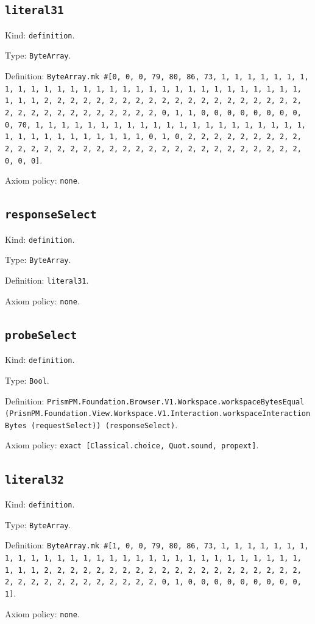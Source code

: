 \documentclass[11pt]{article}
\begin{document}
\subsection*{\texttt{literal31}}
\noindent Kind: \texttt{definition}.\par
\noindent Type: \texttt{ByteArray}.\par
\noindent Definition: \texttt{ByteArray.mk \#[0, 0, 0, 79, 80, 86, 73, 1, 1, 1, 1, 1, 1, 1, 1, 1, 1, 1, 1, 1, 1, 1, 1, 1, 1, 1, 1, 1, 1, 1, 1, 1, 1, 1, 1, 1, 1, 1, 1, 1, 2, 2, 2, 2, 2, 2, 2, 2, 2, 2, 2, 2, 2, 2, 2, 2, 2, 2, 2, 2, 2, 2, 2, 2, 2, 2, 2, 2, 2, 2, 2, 2, 0, 1, 1, 0, 0, 0, 0, 0, 0, 0, 0, 0, 70, 1, 1, 1, 1, 1, 1, 1, 1, 1, 1, 1, 1, 1, 1, 1, 1, 1, 1, 1, 1, 1, 1, 1, 1, 1, 1, 1, 1, 1, 1, 1, 1, 0, 1, 0, 2, 2, 2, 2, 2, 2, 2, 2, 2, 2, 2, 2, 2, 2, 2, 2, 2, 2, 2, 2, 2, 2, 2, 2, 2, 2, 2, 2, 2, 2, 2, 2, 0, 0, 0]}.\par
\noindent Axiom policy: \texttt{none}.\par
\subsection*{\texttt{responseSelect}}
\noindent Kind: \texttt{definition}.\par
\noindent Type: \texttt{ByteArray}.\par
\noindent Definition: \texttt{literal31}.\par
\noindent Axiom policy: \texttt{none}.\par
\subsection*{\texttt{probeSelect}}
\noindent Kind: \texttt{definition}.\par
\noindent Type: \texttt{Bool}.\par
\noindent Definition: \texttt{PrismPM.Foundation.Browser.V1.Workspace.workspaceBytesEqual (PrismPM.Foundation.View.Workspace.V1.Interaction.workspaceInteractionBytes (requestSelect)) (responseSelect)}.\par
\noindent Axiom policy: \texttt{exact [Classical.choice, Quot.sound, propext]}.\par
\subsection*{\texttt{literal32}}
\noindent Kind: \texttt{definition}.\par
\noindent Type: \texttt{ByteArray}.\par
\noindent Definition: \texttt{ByteArray.mk \#[1, 0, 0, 79, 80, 86, 73, 1, 1, 1, 1, 1, 1, 1, 1, 1, 1, 1, 1, 1, 1, 1, 1, 1, 1, 1, 1, 1, 1, 1, 1, 1, 1, 1, 1, 1, 1, 1, 1, 1, 2, 2, 2, 2, 2, 2, 2, 2, 2, 2, 2, 2, 2, 2, 2, 2, 2, 2, 2, 2, 2, 2, 2, 2, 2, 2, 2, 2, 2, 2, 2, 2, 0, 1, 0, 0, 0, 0, 0, 0, 0, 0, 0, 1]}.\par
\noindent Axiom policy: \texttt{none}.\par
\end{document}
